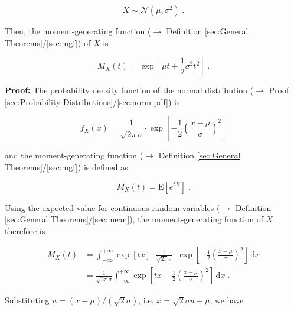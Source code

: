 \documentclass[a4paper,12pt,twoside]{book}
\begin{document}
\begin{equation} \label{eq:norm-mgf-norm}
X \sim \mathcal{N}(\mu, \sigma^2) \; .
\end{equation}

Then, the moment-generating function ($\rightarrow$ Definition \ref{sec:General Theorems}/\ref{sec:mgf}) of $X$ is

\begin{equation} \label{eq:norm-mgf-norm-mgf}
M_X(t) = \exp\left[ \mu t + \frac{1}{2} \sigma^2 t^2 \right] \; .
\end{equation}


\vspace{1em}
\textbf{Proof:} The probability density function of the normal distribution ($\rightarrow$ Proof \ref{sec:Probability Distributions}/\ref{sec:norm-pdf}) is

\begin{equation} \label{eq:norm-mgf-norm-pdf}
f_X(x) = \frac{1}{\sqrt{2 \pi} \sigma} \cdot \exp \left[ -\frac{1}{2} \left( \frac{x-\mu}{\sigma} \right)^2 \right]
\end{equation}

and the moment-generating function ($\rightarrow$ Definition \ref{sec:General Theorems}/\ref{sec:mgf}) is defined as

\begin{equation} \label{eq:norm-mgf-mgf-var}
M_X(t) = \mathrm{E} \left[ e^{tX} \right] \; .
\end{equation}

Using the expected value for continuous random variables ($\rightarrow$ Definition \ref{sec:General Theorems}/\ref{sec:mean}), the moment-generating function of $X$ therefore is

\begin{equation} \label{eq:norm-mgf-norm-mgf-s1}
\begin{split}
M_X(t) &= \int_{-\infty}^{+\infty} \exp[tx] \cdot \frac{1}{\sqrt{2 \pi} \sigma} \cdot \exp \left[ -\frac{1}{2} \left( \frac{x-\mu}{\sigma} \right)^2 \right] \, \mathrm{d}x \\
&= \frac{1}{\sqrt{2 \pi} \sigma} \int_{-\infty}^{+\infty} \exp\left[ tx - \frac{1}{2} \left( \frac{x-\mu}{\sigma} \right)^2 \right] \, \mathrm{d}x \; .
\end{split}
\end{equation}

Substituting $u = (x-\mu)/(\sqrt{2}\sigma)$, i.e. $x = \sqrt{2}\sigma u + \mu$, we have
\end{document}
